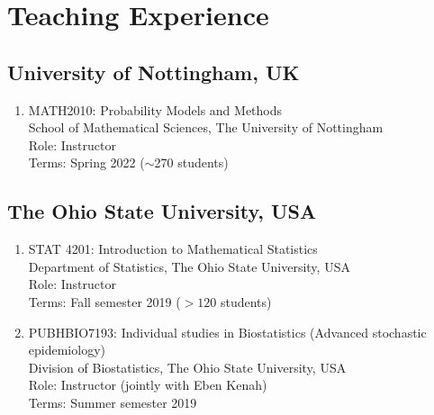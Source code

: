 \documentclass[11pt,a4paper,sans]{moderncv}        %
\begin{document}
\section{Teaching Experience}
\subsection{University of Nottingham, UK}
\begin{enumerate}
	\item MATH2010: Probability Models and Methods\\School of Mathematical Sciences, The University of Nottingham\\Role: Instructor\\Terms: Spring 2022 ($\sim$270 students)
\end{enumerate}

\subsection{The Ohio State University, USA}
\begin{enumerate}
	\item STAT 4201: Introduction to Mathematical Statistics\\Department of Statistics, The Ohio State University, USA\\Role: Instructor\\Terms: Fall semester 2019 ($>120$ students)
	\item PUBHBIO7193: Individual studies in Biostatistics (Advanced stochastic epidemiology)\\Division of Biostatistics, The Ohio State University, USA\\Role: Instructor (jointly with Eben Kenah)\\Terms: Summer semester 2019
\end{enumerate}
\end{document}
